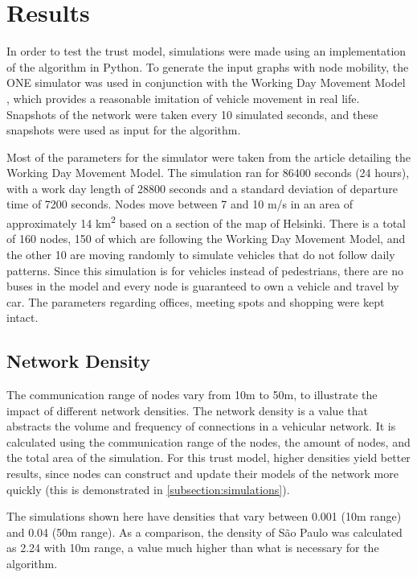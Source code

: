 \documentclass[conference]{IEEEtran}
\begin{document}
\section{Results}
\label{section:results}

In order to test the trust model, simulations were made using an implementation of the algorithm in Python.
To generate the input graphs with node mobility, the ONE simulator \cite{keranen2009one} was used in conjunction with the Working Day Movement Model \cite{ekman2008working}, which provides a reasonable imitation of vehicle movement in real life.
Snapshots of the network were taken every 10 simulated seconds, and these snapshots were used as input for the algorithm.

Most of the parameters for the simulator were taken from the article detailing the Working Day Movement Model.
The simulation ran for 86400 seconds (24 hours), with a work day length of 28800 seconds and a standard deviation of departure time of 7200 seconds.
Nodes move between 7 and 10 m/s in an area of approximately 14 km\textsuperscript{2} based on a section of the map of Helsinki.
There is a total of 160 nodes, 150 of which are following the Working Day Movement Model, and the other 10 are moving randomly to simulate vehicles that do not follow daily patterns.
Since this simulation is for vehicles instead of pedestrians, there are no buses in the model and every node is guaranteed to own a vehicle and travel by car.
The parameters regarding offices, meeting spots and shopping were kept intact.

\subsection{Network Density}
The communication range of nodes vary from 10m to 50m, to illustrate the impact of different network densities.
The network density is a value that abstracts the volume and frequency of connections in a vehicular network.
It is calculated using the communication range of the nodes, the amount of nodes, and the total area of the simulation.
For this trust model, higher densities yield better results, since nodes can construct and update their models of the network more quickly (this is demonstrated in \autoref{subsection:simulations}).

The simulations shown here have densities that vary between 0.001 (10m range) and 0.04 (50m range).
As a comparison, the density of São Paulo was calculated as 2.24 with 10m range, a value much higher than what is necessary for the algorithm.
\end{document}
